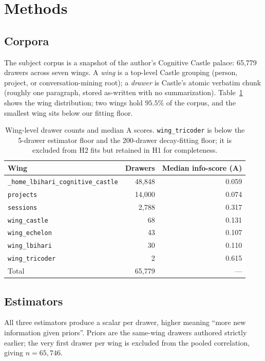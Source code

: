 \documentclass[11pt]{article}
\begin{document}
\section{Methods}
\label{sec:methods}

\subsection{Corpora}
The subject corpus is a snapshot of the author's Cognitive Castle
\citep{cognitivecastle} palace: 65{,}779 drawers across seven wings. A
\emph{wing} is a top-level Castle grouping (person, project, or
conversation-mining root); a \emph{drawer} is Castle's atomic verbatim
chunk (roughly one paragraph, stored as-written with no
summarization). Table~\ref{tab:wings} shows the wing distribution;
two wings hold $95.5\%$ of the corpus, and the smallest wing sits below
our fitting floor.

\begin{table}[h]
\centering
\begin{tabular}{lrr}
\toprule
Wing & Drawers & Median info-score (A) \\
\midrule
\texttt{\_home\_lbihari\_cognitive\_castle} & 48{,}848 & 0.059 \\
\texttt{projects}                            & 14{,}000 & 0.074 \\
\texttt{sessions}                            &  2{,}788 & 0.317 \\
\texttt{wing\_castle}                        &     68 & 0.131 \\
\texttt{wing\_echelon}                       &     43 & 0.107 \\
\texttt{wing\_lbihari}                       &     30 & 0.110 \\
\texttt{wing\_tricoder}                      &      2 & 0.615 \\
\midrule
Total                                        & 65{,}779 & --- \\
\bottomrule
\end{tabular}
\caption{Wing-level drawer counts and median A scores. \texttt{wing\_tricoder}
is below the 5-drawer estimator floor and the 200-drawer decay-fitting floor;
it is excluded from H2 fits but retained in H1 for completeness.}
\label{tab:wings}
\end{table}

\subsection{Estimators}
All three estimators produce a scalar per drawer, higher meaning ``more
new information given priors''. Priors are the same-wing drawers
authored strictly earlier; the very first drawer per wing is excluded
from the pooled correlation, giving $n = 65{,}746$.
\end{document}
